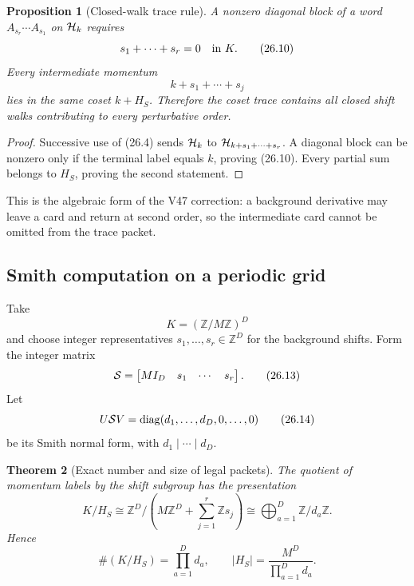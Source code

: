 \documentclass[11pt]{article}
\newtheorem{theorem}{Theorem}[section]
\newtheorem{proposition}[theorem]{Proposition}
\theoremstyle{remark}
\begin{document}
\begin{proposition}[Closed-walk trace rule]
\label{prop:v12v26-walk}
A nonzero diagonal block of a word
\(A_{s_r}\cdots A_{s_1}\) on \({\cal H}_k\) requires
\[
                         s_1+\cdots+s_r=0\quad\hbox{in }K.  \tag{26.10}
\]
Every intermediate momentum
\[
                         k+s_1+\cdots+s_j                  \tag{26.11}
\]
lies in the same coset \(k+H_S\).  Therefore the coset trace contains
all closed shift walks contributing to every perturbative order.
\end{proposition}

\begin{proof}
Successive use of (26.4) sends \({\cal H}_k\) to
\({\cal H}_{k+s_1+\cdots+s_r}\).  A diagonal block can be nonzero
only if the terminal label equals \(k\), proving (26.10).  Every
partial sum belongs to \(H_S\), proving the second statement.
\end{proof}

This is the algebraic form of the V47 correction: a background
derivative may leave a card and return at second order, so the
intermediate card cannot be omitted from the trace packet.

\subsection{Smith computation on a periodic grid}

Take
\[
                         K=(\mathbb Z/M\mathbb Z)^D         \tag{26.12}
\]
and choose integer representatives
\(s_1,\ldots,s_r\in\mathbb Z^D\) for the background shifts.  Form the
integer matrix
\[
                         {\cal S}
 =
 \begin{bmatrix}
 MI_D&s_1&\cdots&s_r
 \end{bmatrix}.                                             \tag{26.13}
\]
Let
\[
                         U{\cal S}V
 =
 \operatorname{diag}(d_1,\ldots,d_D,0,\ldots,0)             \tag{26.14}
\]
be its Smith normal form, with
\(d_1\mid\cdots\mid d_D\).

\begin{theorem}[Exact number and size of legal packets]
\label{thm:v12v26-Smith}
The quotient of momentum labels by the shift subgroup has the
presentation
\[
 K/H_S
 \cong
 \mathbb Z^D/
 \left(M\mathbb Z^D+\sum_{j=1}^r\mathbb Zs_j\right)
 \cong
 \bigoplus_{a=1}^D\mathbb Z/d_a\mathbb Z.                  \tag{26.15}
\]
Hence
\[
 \#(K/H_S)=\prod_{a=1}^Dd_a,\qquad
 |H_S|=\frac{M^D}{\prod_{a=1}^Dd_a}.                       \tag{26.16}
\]
\end{theorem}
\end{document}

